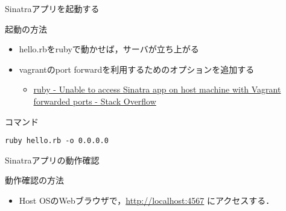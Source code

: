 \documentclass[t, aspectratio=169]{beamer}
\begin{document}
\begin{frame}[fragile,label=sec-5-1-4]{Sinatraアプリを起動する}
 \begin{block}{起動の方法}
\begin{itemize}
\item hello.rbをrubyで動かせば，サーバが立ち上がる
\item vagrantのport forwardを利用するためのオプションを追加する
\begin{itemize}
\item \href{http://stackoverflow.com/questions/21250885/unable-to-access-sinatra-app-on-host-machine-with-vagrant-forwarded-ports}{ruby - Unable to access Sinatra app on host machine with Vagrant forwarded ports - Stack Overflow}
\end{itemize}
\end{itemize}
\end{block}
\begin{block}{コマンド}
\begin{verbatim}
ruby hello.rb -o 0.0.0.0
\end{verbatim}
\end{block}
\end{frame}
\begin{frame}[label=sec-5-1-5]{Sinatraアプリの動作確認}
\begin{block}{動作確認の方法}
\begin{itemize}
\item Host OSのWebブラウザで，\url{http://localhost:4567} にアクセスする．
\end{itemize}
\end{block}
\end{frame}
\end{document}
